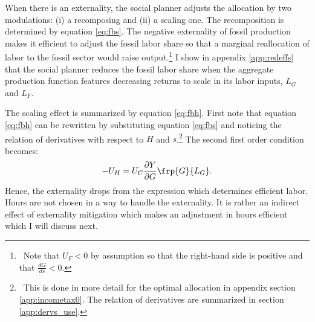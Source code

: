 When there is an externality, the social planner adjusts the allocation by two modulations: (i) a recomposing and (ii) a scaling one. 
The recomposition is determined by equation \ref{eq:fbs}.
The negative externality of fossil production makes it efficient to adjust the fossil labor share so that  a marginal reallocation of labor to the fossil sector would raise output.\footnote{\ Note that $U_F<0$ by assumption so that the right-hand side is positive and that $\frac{dG}{ds}<0$. }
I show in appendix \ref{app:redeffs} that the social planner reduces the fossil labor share when the aggregate production function features decreasing returns to scale in its labor inputs, $L_G$ and $L_F$.
\begin{comment}
The equation 
\begin{align}
\frac{-U_F}{U_C \frac{dY}{dF}}=1+\frac{\frac{dY}{dG}\frac{dG}{ds}}{\frac{dY}{dF}\frac{dF}{ds}}.
\end{align}
The term on the left-hand side is the social cost of the externality: it measures what the representative household is willing to pay for a further reduction in fossil production. 
\end{comment}

The scaling effect is summarized by equation \ref{eq:fbh}.
First note that equation \ref{eq:fbh} can be rewritten by substituting equation \ref{eq:fbs} and noticing the relation of derivatives with respect to $H$ and $s$.\footnote{\ This is done in more detail for the optimal allocation in appendix section \ref{app:incometax0}. The relation of derivatives are summarized in section \ref{app:dervs_use}.}  
The second first order condition becomes:
\begin{align}\label{eq:fbh_simp}
-U_H=U_C\frac{\partial Y}{\partial G}\frp{G}{L_G}.
\end{align}
Hence, the externality drops from the expression which determines efficient labor. Hours are not chosen in a way to handle the externality. It is rather an indirect effect of externality mitigation which makes an adjustment in hours efficient which I will discuss next.

